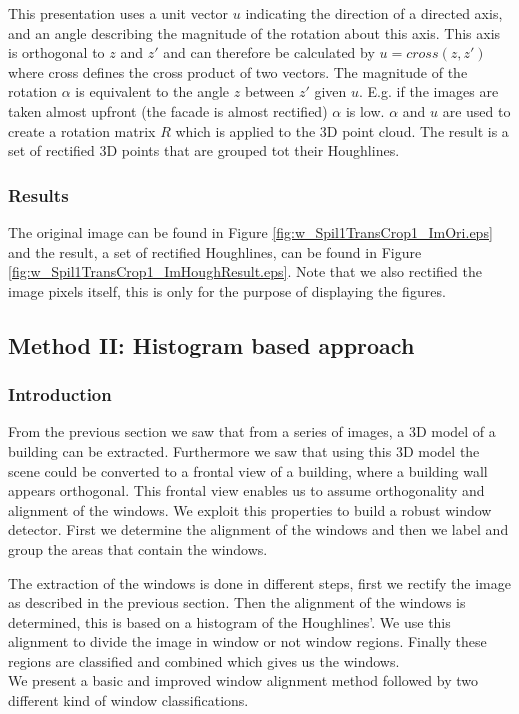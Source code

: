 This presentation uses a unit vector $u$ indicating the direction of a directed axis, and an
angle describing the magnitude of the rotation about this axis.
This axis is orthogonal to $z$ and $z'$ and can therefore be
calculated by $u = cross(z,z')$ where cross defines the cross product of
two vectors.
The magnitude of the rotation $\alpha$ is equivalent to the angle $z$ between $z'$ given $u$. 
E.g. if the images are taken almost upfront (the facade is almost rectified) $\alpha$ is low.
$\alpha$ and $u$ are used to create a rotation matrix $R$ which is applied to the 3D point cloud.
The result is a set of rectified 3D points that are grouped tot their Houghlines.

\subsubsection{Results} %
The original image can be found in Figure \ref{fig:w_Spil1TransCrop1_ImOri.eps}
and the result, a set of rectified Houghlines, can be found in Figure \ref{fig:w_Spil1TransCrop1_ImHoughResult.eps}.
Note that we also rectified the image pixels itself, this is only for
the purpose of displaying the figures.



\subsection{Method II: Histogram based approach} 
\subsubsection{Introduction}
From the previous section we saw that from a series of images, a 3D model of a
building can be extracted. Furthermore we saw that using this 3D model the
scene could be converted to a frontal view of a building, where a building wall
appears orthogonal.  This frontal view enables us to assume orthogonality and
alignment of the windows. 
We exploit this properties to build a robust window detector. First we determine
the alignment of the windows and then we label and group the areas that
contain the windows. 


The extraction of the windows is done in different steps, first we rectify the
image as described in the previous section.  Then the alignment of the windows
is determined, this is based on a histogram of the Houghlines'. We use this
alignment to divide the image in window or not window regions.  Finally these
regions are classified and combined which gives us the windows.\\
We present a basic and improved window alignment method
followed by two different kind of window classifications. 


